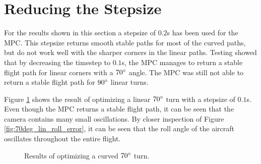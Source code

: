\section{Reducing the Stepsize}
\label{sec:reducing_stepsize}

For the results shown in this section a stepsize of $0.2$s has been used for the MPC. This stepsize returns smooth stable paths for most of the curved paths, but do not work well with the sharper corners in the linear paths. Testing showed that by decreasing the timestep to $0.1$s, the MPC manages to return a stable flight path for linear corners with a $70\degree$ angle. The MPC was still not able to return a stable flight path for $90\degree$ linear turns.

Figure \ref{fig:70deg_lin_error} shows the result of optimizing a linear $70\degree$ turn with a stepsize of $0.1$s. Even though the MPC returns a stable flight path, it can be seen that the camera contains many small oscillations. By closer inspection of Figure \ref{fig:70deg_lin_roll_error}, it can be seen that the roll angle of the aircraft oscillates throughout the entire flight.

\begin{figure}
	\caption{Results of optimizing a curved $70\degree$ turn.}
	\label{fig:70deg_lin_error}
\end{figure}